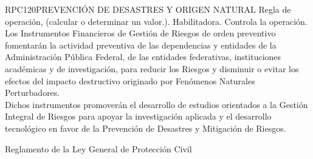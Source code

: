 \begin{BusinessRule}{RPC120}{PREVENCIÓN DE DESASTRES Y ORIGEN NATURAL}{
		Regla de operación, (calcular o determinar un valor.).
	}{
		Habilitadora. 
	}{
		Controla la operación. %
	}
	\BRItem[Descripción:] Los Instrumentos Financieros de Gestión de Riesgos de orden preventivo fomentarán la actividad preventiva de las dependencias y entidades de la Administración Pública Federal, de las entidades federativas, instituciones académicas y de investigación, para reducir los Riesgos y disminuir o evitar los efectos del impacto destructivo originado por Fenómenos Naturales Perturbadores.\\Dichos instrumentos promoverán el desarrollo de estudios orientados a la Gestión Integral de Riesgos para apoyar la investigación aplicada y el desarrollo tecnológico en favor de la Prevención de Desastres y Mitigación de Riesgos.
	
	
	 Reglamento de la Ley General de Protección Civil
\end{BusinessRule}